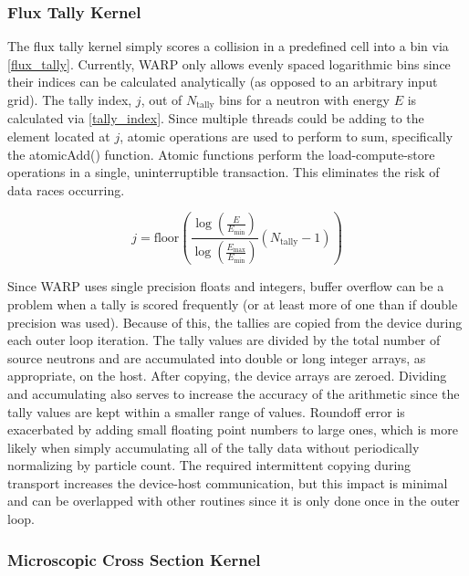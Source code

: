 \subsubsection{Flux Tally Kernel}

The flux tally kernel simply scores a collision in a predefined cell into a bin via \eqref{flux_tally}.  Currently, WARP only allows evenly spaced logarithmic bins since their indices can be calculated analytically (as opposed to an arbitrary input grid).  The tally index, $j$, out of $N_\mathrm{tally}$ bins for a neutron with energy $E$ is calculated via \eqref{tally_index}.  Since multiple threads could be adding to the element located at $j$, atomic operations are used to perform to sum, specifically the atomicAdd() function.  Atomic functions perform the load-compute-store operations in a single, uninterruptible transaction.  This eliminates the risk of data races occurring.

\begin{equation}
j = \mathrm{floor} \left( \frac{ \log \left( \frac{E}{E_\mathrm{min}} \right)} { \log \left( \frac{E_\mathrm{max}}{E_\mathrm{min}} \right)} (N_\mathrm{tally}-1) \right)
\label{tally_index}
\end{equation}

Since WARP uses single precision floats and integers, buffer overflow can be a problem when a tally is scored frequently (or at least more of one than if double precision was used).  Because of this, the tallies are copied from the device during each outer loop iteration.  The tally values are divided by the total number of source neutrons and are accumulated into double or long integer arrays, as appropriate, on the host.  After copying, the device arrays are zeroed.  Dividing and accumulating also serves to increase the accuracy of the arithmetic since the tally values are kept within a smaller range of values. Roundoff error is exacerbated by adding small floating point numbers to large ones, which is more likely when simply accumulating all of the tally data without periodically normalizing by particle count.  The required intermittent copying during transport increases the device-host communication, but this impact is minimal and can be overlapped with other routines since it is only done once in the outer loop.

\subsubsection{Microscopic Cross Section Kernel}

